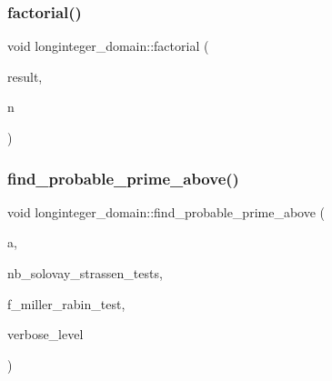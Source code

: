 \mbox{\label{classlonginteger__domain_a284865ee9a771a5600baf6337dbecc00}} 
\subsubsection{\texorpdfstring{factorial()}{factorial()}}
{\footnotesize\ttfamily void longinteger\+\_\+domain\+::factorial (\begin{DoxyParamCaption}\item[{\mbox{\hyperlink{classlonginteger__object}{longinteger\+\_\+object}} \&}]{result,  }\item[{\mbox{\hyperlink{galois_8h_a09fddde158a3a20bd2dcadb609de11dc}{I\+NT}}}]{n }\end{DoxyParamCaption})}

\mbox{\label{classlonginteger__domain_a46944b99c740242bfe23a86b50d6a60d}} 
\subsubsection{\texorpdfstring{find\+\_\+probable\+\_\+prime\+\_\+above()}{find\_probable\_prime\_above()}}
{\footnotesize\ttfamily void longinteger\+\_\+domain\+::find\+\_\+probable\+\_\+prime\+\_\+above (\begin{DoxyParamCaption}\item[{\mbox{\hyperlink{classlonginteger__object}{longinteger\+\_\+object}} \&}]{a,  }\item[{\mbox{\hyperlink{galois_8h_a09fddde158a3a20bd2dcadb609de11dc}{I\+NT}}}]{nb\+\_\+solovay\+\_\+strassen\+\_\+tests,  }\item[{\mbox{\hyperlink{galois_8h_a09fddde158a3a20bd2dcadb609de11dc}{I\+NT}}}]{f\+\_\+miller\+\_\+rabin\+\_\+test,  }\item[{\mbox{\hyperlink{galois_8h_a09fddde158a3a20bd2dcadb609de11dc}{I\+NT}}}]{verbose\+\_\+level }\end{DoxyParamCaption})}

\mbox{\label{classlonginteger__domain_a6366e067c17ed40c7168961cf10b2e9d}} 
